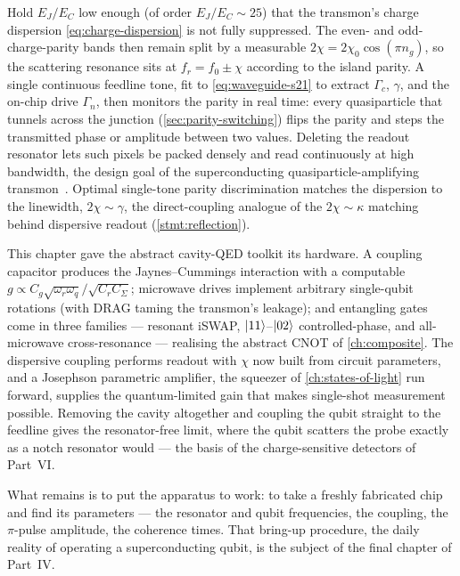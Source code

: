 \begin{application}
\label{app:squat}
Hold $E_J/E_C$ low enough (of order $E_J/E_C\sim25$) that the
transmon's charge dispersion \cref{eq:charge-dispersion} is not fully
suppressed. The even- and odd-charge-parity bands then remain split by
a measurable $2\chi=2\chi_0\cos(\pi n_g)$, so the scattering resonance
sits at $f_r=f_0\pm\chi$ according to the island parity. A single
continuous feedline tone, fit to \cref{eq:waveguide-s21} to extract
$\Gamma_c$, $\gamma$, and the on-chip drive $\Gamma_n$, then monitors
the parity in real time: every quasiparticle that tunnels across the
junction (\cref{sec:parity-switching}) flips the parity and steps the
transmitted phase or amplitude between two values. Deleting the readout
resonator lets such pixels be packed densely and read continuously at
high bandwidth, the design goal of the superconducting
quasiparticle-amplifying transmon~\cite{magoon2026,fink2024}. Optimal
single-tone parity discrimination matches the dispersion to the
linewidth, $2\chi\sim\gamma$, the direct-coupling analogue of the
$2\chi\sim\kappa$ matching behind dispersive readout
(\cref{stmt:reflection}).
\end{application}

This chapter gave the abstract cavity-QED toolkit its hardware. A
coupling capacitor produces the Jaynes--Cummings interaction with a
computable $g\propto C_g\sqrt{\omega_r\omega_q}/\sqrt{C_rC_\Sigma}$;
microwave drives implement arbitrary single-qubit rotations (with DRAG
taming the transmon's leakage); and entangling gates come in three
families --- resonant iSWAP, $\ket{11}$--$\ket{02}$ controlled-phase,
and all-microwave cross-resonance --- realising the abstract CNOT of
\cref{ch:composite}. The dispersive coupling performs readout with
$\chi$ now built from circuit parameters, and a Josephson parametric
amplifier, the squeezer of \cref{ch:states-of-light} run forward,
supplies the quantum-limited gain that makes single-shot measurement
possible. Removing the cavity altogether and coupling the qubit
straight to the feedline gives the resonator-free limit, where the
qubit scatters the probe exactly as a notch resonator would --- the
basis of the charge-sensitive detectors of Part~VI.

What remains is to put the apparatus to work: to take a freshly
fabricated chip and find its parameters --- the resonator and qubit
frequencies, the coupling, the $\pi$-pulse amplitude, the coherence
times. That bring-up procedure, the daily reality of operating a
superconducting qubit, is the subject of the final chapter of
Part~IV.

